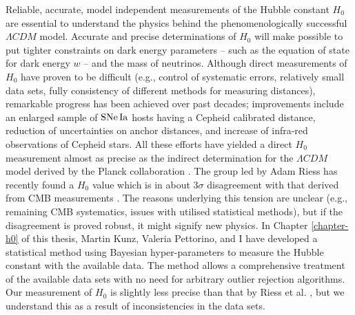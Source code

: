 Reliable, accurate, model independent measurements of the Hubble constant $H_0$ are essential to understand the physics behind the phenomenologically successful $\Lambda CDM$ model. Accurate and precise determinations of $H_0$ will make possible to put tighter constraints on dark energy parameters -- such as the equation of state for dark energy $w$ -- and the mass of neutrinos. Although direct measurements of $H_0$ have proven to be difficult (e.g., control of systematic errors, relatively small data sets, fully consistency of different methods for measuring distances), remarkable progress has been achieved over past decades; improvements include an enlarged sample of $\mathrm{SNe\,Ia}$ hosts having a Cepheid calibrated distance, reduction of uncertainties on anchor distances, and increase of infra-red observations of Cepheid stars. All these efforts have yielded a direct $H_0$ measurement almost as precise as the indirect determination for the $\Lambda CDM$ model derived by the Planck collaboration \cite{Ade:2015xua,Riess:2016jrr}. The group led by Adam Riess has recently found a $H_0$ value which is in about $ 3\sigma$ disagreement with that derived from CMB measurements \cite{Riess:2016jrr}. The reasons underlying this tension are unclear (e.g., remaining CMB systematics, issues with utilised statistical methods), but if the disagreement is proved robust, it might signify new physics.  In Chapter \ref{chapter-h0} of this thesis, Martin Kunz, Valeria Pettorino, and I have developed a statistical method using Bayesian hyper-parameters to measure the Hubble constant with the available data. The method allows a comprehensive treatment of the available data sets with no need for arbitrary outlier rejection algorithms. Our measurement of $H_0$ is slightly less precise than that by Riess et al. \cite{Riess:2016jrr}, but we understand this as a result of inconsistencies in the data sets. 